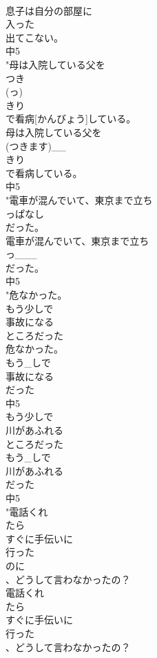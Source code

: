 \documentclass[8pt]{extreport}
\begin{document}
\begin{CJK}{UTF8}{min}
\\	息子は自分の部屋に
\\	入った
\\	出てこない。
\\	中5
\\	"母は入院している父を
\\	つき
\\	(っ)
\\	きり
\\	で看病[かんびょう]している。
\\	母は入院している父を
\\	(つきます)__
\\	きり
\\	で看病している。
\\	中5
\\	"電車が混んでいて、東京まで立ち
\\	っぱなし
\\	だった。
\\	電車が混んでいて、東京まで立ち
\\	っ___
\\	だった。
\\	中5
\\	"危なかった。
\\	もう少しで
\\	事故になる
\\	ところだった
\\	危なかった。
\\	もう_しで
\\	事故になる
\\	だった
\\	中5
\\	もう少しで
\\	川があふれる
\\	ところだった
\\	もう_しで
\\	川があふれる
\\	だった
\\	中5
\\	"電話くれ
\\	たら
\\	すぐに手伝いに
\\	行った
\\	のに
\\	、どうして言わなかったの？
\\	電話くれ
\\	たら
\\	すぐに手伝いに
\\	行った
\\	、どうして言わなかったの？

\end{CJK}
\end{document}
